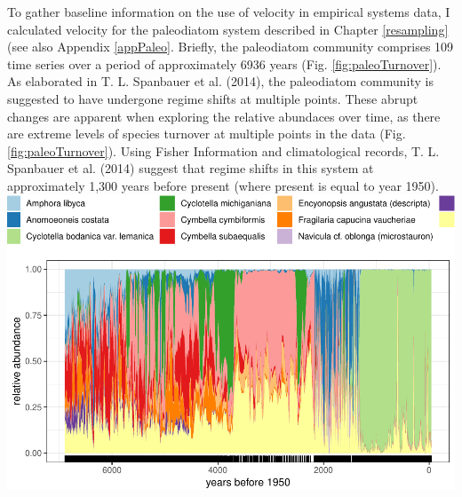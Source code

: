 \documentclass[12pt,twoside,openany]{reedthesis}
\begin{document}
To gather baseline information on the use of velocity in empirical
systems data, I calculated velocity for the paleodiatom system described
in Chapter \ref{resampling} (see also Appendix \ref{appPaleo}. Briefly,
the paleodiatom community comprises 109 time series over a period of
approximately 6936 years (Fig. \ref{fig:paleoTurnover}). As elaborated
in T. L. Spanbauer et al. (2014), the paleodiatom community is suggested
to have undergone regime shifts at multiple points. These abrupt changes
are apparent when exploring the relative abundaces over time, as there
are extreme levels of species turnover at multiple points in the data
(Fig. \ref{fig:paleoTurnover}). Using Fisher Information and
climatological records, T. L. Spanbauer et al. (2014) suggest that
regime shifts in this system at approximately 1,300 years before present
(where present is equal to year 1950).
\includegraphics{_myDissertation_files/figure-latex/paleoTurnover-1.pdf}
\end{document}
